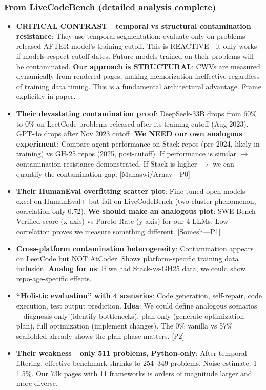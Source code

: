 \subsubsection{From LiveCodeBench (detailed analysis complete)}
\begin{itemize}
    \item \textbf{CRITICAL CONTRAST---temporal vs structural contamination resistance}: They use temporal segmentation: evaluate only on problems released AFTER model's training cutoff. This is REACTIVE---it only works if models respect cutoff dates. Future models trained on their problems will be contaminated. \textbf{Our approach is STRUCTURAL}: CWVs are measured dynamically from rendered pages, making memorization ineffective regardless of training data timing. This is a fundamental architectural advantage. Frame explicitly in paper.
    \item \textbf{Their devastating contamination proof}: DeepSeek-33B drops from 60\% to 0\% on LeetCode problems released after its training cutoff (Aug 2023). GPT-4o drops after Nov 2023 cutoff. \textbf{We NEED our own analogous experiment}: Compare agent performance on Stack repos (pre-2024, likely in training) vs GH-25 repos (2025, post-cutoff). If performance is similar $\rightarrow$ contamination resistance demonstrated. If Stack is higher $\rightarrow$ we can quantify the contamination gap. [Manaswi/Arnav---P0]
    \item \textbf{Their HumanEval overfitting scatter plot}: Fine-tuned open models excel on HumanEval+ but fail on LiveCodeBench (two-cluster phenomenon, correlation only 0.72). \textbf{We should make an analogous plot}: SWE-Bench Verified score (x-axis) vs \OurBench Pareto Rate (y-axis) for our 4 LLMs. Low correlation proves we measure something different. [Somesh---P1]
    \item \textbf{Cross-platform contamination heterogeneity}: Contamination appears on LeetCode but NOT AtCoder. Shows platform-specific training data inclusion. \textbf{Analog for us}: If we had Stack-vs-GH25 data, we could show repo-age-specific effects.
    \item \textbf{``Holistic evaluation'' with 4 scenarios}: Code generation, self-repair, code execution, test output prediction. \textbf{Idea}: We could define analogous scenarios---diagnosis-only (identify bottlenecks), plan-only (generate optimization plan), full optimization (implement changes). The 0\% vanilla vs 57\% scaffolded already shows the plan phase matters. [P2]
    \item \textbf{Their weakness---only 511 problems, Python-only}: After temporal filtering, effective benchmark shrinks to 254--349 problems. Noise estimate: 1--1.5\%. Our 73k pages with 11 frameworks is orders of magnitude larger and more diverse.

\end{itemize}
